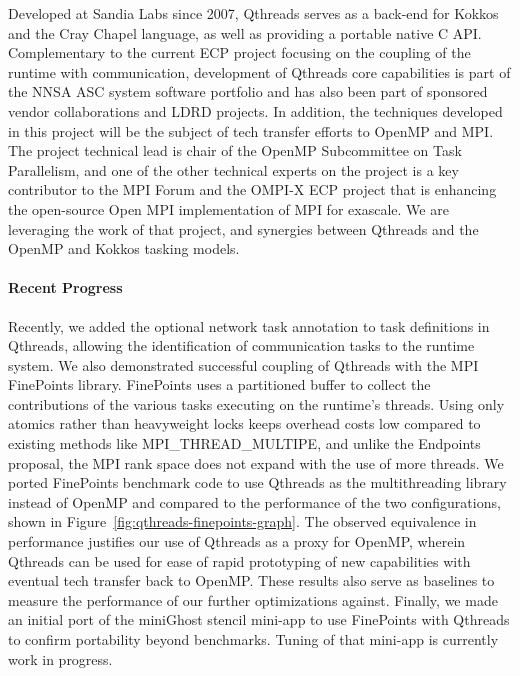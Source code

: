 Developed at Sandia Labs since 2007, Qthreads serves as a back-end for Kokkos and the Cray Chapel language, as well as providing a portable native C API. Complementary to the current ECP project focusing on the coupling of the runtime with communication, development of Qthreads core capabilities is part of the NNSA ASC system software portfolio and has also been part of sponsored vendor collaborations and LDRD projects.  In addition, the techniques developed in this project will be the subject of tech transfer efforts to OpenMP and MPI.  The project technical lead is chair of the OpenMP Subcommittee on Task Parallelism, and one of the other technical experts on the project is a key contributor to the MPI Forum and the OMPI-X ECP project that is enhancing the open-source Open MPI implementation of MPI for exascale.  We are leveraging the work of that project, and synergies between Qthreads and the OpenMP and Kokkos tasking models.


\paragraph{Recent Progress}

Recently, we added the optional network task annotation to task definitions in Qthreads, allowing the identification of communication tasks to the runtime system.  We also demonstrated successful coupling of Qthreads with the MPI FinePoints library.  FinePoints uses a partitioned buffer to collect the contributions of the various tasks executing on the runtime’s threads.  Using only atomics rather than heavyweight locks keeps overhead costs low compared to existing methods like MPI\_THREAD\_MULTIPE, and unlike the Endpoints proposal, the MPI rank space does not expand with the use of more threads.  We ported FinePoints benchmark code to use Qthreads as the multithreading library instead of OpenMP and compared to the performance of the two configurations, shown in Figure~\ref{fig:qthreads-finepoints-graph}. The observed equivalence in performance justifies our use of Qthreads as a proxy for OpenMP, wherein Qthreads can be used for ease of rapid prototyping of new capabilities with eventual tech transfer back to OpenMP.  These results also serve as baselines to measure the performance of our further optimizations against.  Finally, we made an initial port of the miniGhost stencil mini-app to use FinePoints with Qthreads to confirm portability beyond benchmarks.  Tuning of that mini-app is currently work in progress.

